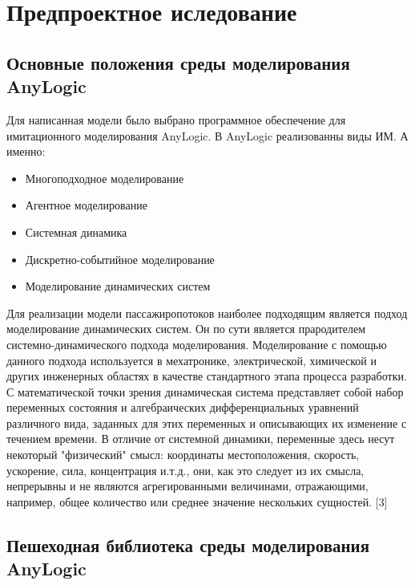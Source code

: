 \documentclass[12pt]{article}
\begin{document}
	\newpage
	\section{Предпроектное иследование}
		\subsection{Основные положения среды моделирования AnyLogic }
			\hspace{\parindent} 
Для написанная модели было выбрано программное обеспечение для имитационного моделирования AnyLogic. В AnyLogic реализованны виды ИМ. А именно: 


\begin{itemize}
	\item Многоподходное моделирование
	\item Агентное моделирование
	\item Системная динамика
	\item Дискретно-событийное моделирование
	\item Моделирование динамических систем

\end{itemize}
\indent Для реализации модели пассажиропотоков наиболее подходящим является подход моделирование динамических систем. Он по сути является прародителем системно-динамического подхода моделирования. Моделирование с помощью данного подхода используется в мехатронике, электрической, химической и других инженерных областях в качестве стандартного этапа процесса разработки. С математической точки зрения динамическая система представляет собой набор переменных состояния и алгебраических дифференциальных уравнений различного вида, заданных для этих переменных и описывающих их изменение с течением времени. В отличие от системной динамики, переменные здесь несут некоторый "физический" смысл: координаты местоположения, скорость, ускорение, сила, концентрация и.т.д., они, как это следует из их смысла, непрерывны и не являются агрегированными величинами, отражающими, например, общее количество или среднее значение нескольких сущностей. [3]\\
\newpage
		\subsection {Пешеходная библиотека среды моделирования AnyLogic }
			\hspace{\parindent}
			
\end{document}
